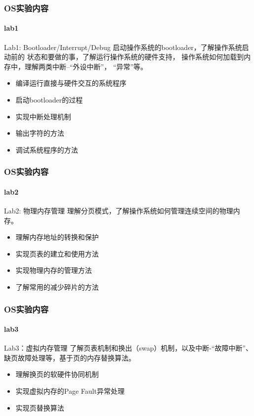 \begin{frame}
\frametitle{OS实验内容}
\framesubtitle{lab1}
\begin{block}{Lab1:  Bootloader/Interrupt/Debug}
启动操作系统的bootloader，了解操作系统启动前的
状态和要做的事，了解运行操作系统的硬件支持，
操作系统如何加载到内存中，理解两类中断--“外设中断”，   
“异常”等。
\end{block}

\begin{itemize}
    \item 编译运行直接与硬件交互的系统程序
    \item 启动bootloader的过程
    \item 实现中断处理机制
    \item 输出字符的方法
    \item 调试系统程序的方法
\end{itemize}
    
\end{frame}


\begin{frame}
\frametitle{OS实验内容}
\framesubtitle{lab2}

\begin{block}{Lab2:  物理内存管理}
理解分页模式，了解操作系统如何管理连续空间的物理内存。
\end{block}

\begin{itemize}
    \item 理解内存地址的转换和保护
    \item 实现页表的建立和使用方法
    \item 实现物理内存的管理方法
    \item 了解常用的减少碎片的方法
\end{itemize}

\end{frame}

\begin{frame}
\frametitle{OS实验内容}
\framesubtitle{lab3}

\begin{block}{Lab3：虚拟内存管理}
了解页表机制和换出（swap）机制，以及中断-“故障中断”、
缺页故障处理等，基于页的内存替换算法。
\end{block}

\begin{itemize}
    \item 理解换页的软硬件协同机制
    \item 实现虚拟内存的Page Fault异常处理
    \item 实现页替换算法
\end{itemize}

\end{frame}

